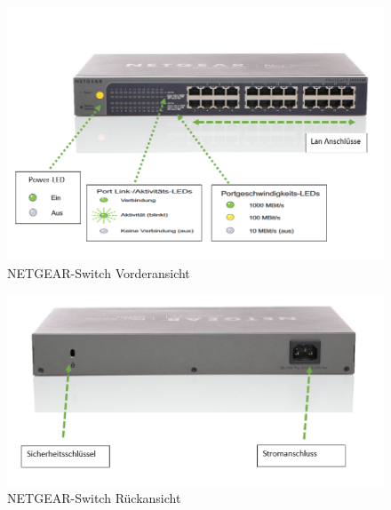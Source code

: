     \begin{figure}[ht]
        \centering
        \includegraphics[scale=0.9]{images/netgear-switch-1.png}
        \caption{NETGEAR-Switch Vorderansicht}
    \end{figure}
    \begin{figure}[ht]
        \centering
        \includegraphics[scale=0.9]{images/netgear-switch-2.png}
        \caption{NETGEAR-Switch Rückansicht}
    \end{figure}
